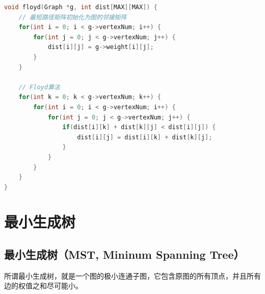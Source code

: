 \begin{table}[H]
    \centering
\end{table}


\begin{lstlisting}[language=C]
void floyd(Graph *g, int dist[MAX][MAX]) {
    // 最短路径矩阵初始化为图的邻接矩阵
    for(int i = 0; i < g->vertexNum; i++) {
        for(int j = 0; j < g->vertexNum; j++) {
            dist[i][j] = g->weight[i][j];
        }
    }

    // Floyd算法
    for(int k = 0; k < g->vertexNum; k++) {
        for(int i = 0; i < g->vertexNum; i++) {
            for(int j = 0; j < g->vertexNum; j++) {
                if(dist[i][k] + dist[k][j] < dist[i][j]) {
                    dist[i][j] = dist[i][k] + dist[k][j];
                }
            }
        }
    }
}
\end{lstlisting}

\newpage

\section{最小生成树}

\subsection{最小生成树（MST, Mininum Spanning Tree）}

所谓最小生成树，就是一个图的极小连通子图，它包含原图的所有顶点，并且所有边的权值之和尽可能小。 \\

